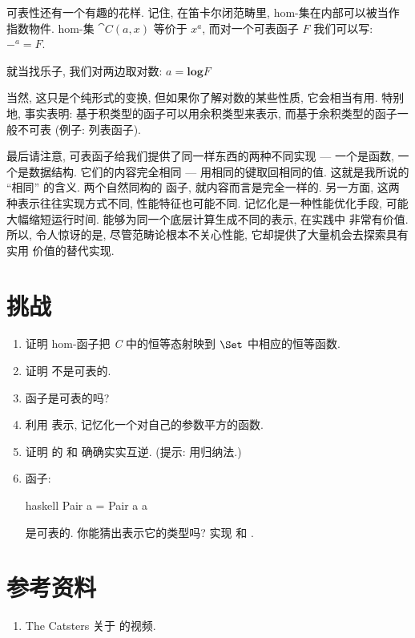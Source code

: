 可表性还有一个有趣的花样. 记住, 在笛卡尔闭范畴里, hom-集在内部可以被当作指数物件.
hom-集 $\cat{C}(a, x)$ 等价于 $x^a$, 而对一个可表函子 $F$
我们可以写: $-^a = F$.

就当找乐子, 我们对两边取对数: $a = \mathbf{log}F$

当然, 这只是个纯形式的变换, 但如果你了解对数的某些性质, 它会相当有用. 特别地, 事实表明:
基于积类型的函子可以用余积类型来表示, 而基于余积类型的函子一般不可表 (例子: 列表函子).

最后请注意, 可表函子给我们提供了同一样东西的两种不同实现 --- 一个是函数, 一个是数据结构.
它们的内容完全相同 --- 用相同的键取回相同的值. 这就是我所说的 ``相同'' 的含义. 两个自然同构的
函子, 就内容而言是完全一样的. 另一方面, 这两种表示往往实现方式不同, 性能特征也可能不同.
记忆化是一种性能优化手段, 可能大幅缩短运行时间. 能够为同一个底层计算生成不同的表示, 在实践中
非常有价值. 所以, 令人惊讶的是, 尽管范畴论根本不关心性能, 它却提供了大量机会去探索具有实用
价值的替代实现.

\section{挑战}

\begin{enumerate}
  \tightlist
  \item
        证明 hom-函子把 \emph{C} 中的恒等态射映到 $\Set$ 中相应的恒等函数.
  \item
        证明  不是可表的.
  \item
         函子是可表的吗?
  \item
        利用  表示, 记忆化一个对自己的参数平方的函数.
  \item
        证明  的  和  确确实实互逆.
        (提示: 用归纳法.)
  \item
        函子:

        \begin{snip}{haskell}
Pair a = Pair a a
\end{snip}
        是可表的. 你能猜出表示它的类型吗? 实现  和 .
\end{enumerate}

\section{参考资料}

\begin{enumerate}
  \tightlist
  \item
        The Catsters 关于
        的视频.
\end{enumerate}
